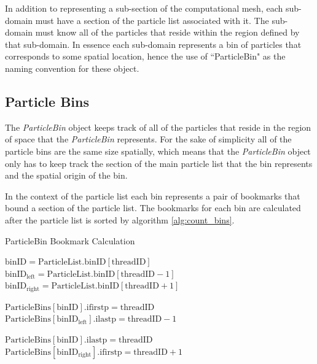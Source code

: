 In addition to representing a sub-section of the computational mesh, each sub-domain must have a section of the particle list associated with it. The sub-domain must know all of the particles that reside within the region defined by that sub-domain. In essence each sub-domain represents a bin of particles that corresponds to some spatial location, hence the use of ``ParticleBin"  as the naming convention for these object.



	\subsection{Particle Bins}
The \emph{ParticleBin} object keeps track of all of the particles that reside in the region of space that the \emph{ParticleBin} represents. For the sake of simplicity all of the particle bins are the same size spatially, which means that the \emph{ParticleBin} object only has to keep track the section of the main particle list that the bin represents and the spatial origin of the bin. 

In the context of the particle list each bin represents a pair of bookmarks that bound a section of the particle list. The bookmarks for each bin are calculated after the particle list is sorted by algorithm \ref{alg:count_bins}.

\begin{algorithm}
	\caption{ParticleBin Bookmark Calculation}
	\label{alg:count_bins}
	\begin{algorithmic}
			\STATE 
			\STATE $\mathrm{binID} = \mathrm{ParticleList.binID}[\mathrm{threadID}]$
			\STATE $\mathrm{binID_{left}} = \mathrm{ParticleList.binID}[\mathrm{threadID} - 1]$
			\STATE $\mathrm{binID_{right}} = \mathrm{ParticleList.binID}[\mathrm{threadID} + 1]$
			
				\STATE $\mathrm{ParticleBins[binID].ifirstp} = \mathrm{threadID}$
				\STATE $\mathrm{ParticleBins[binID_{left}].ilastp} = \mathrm{threadID} - 1$
			\ENDIF

				\STATE $\mathrm{ParticleBins[binID].ilastp} = \mathrm{threadID}$
				\STATE $\mathrm{ParticleBins[binID_{right}].ifirstp} = \mathrm{threadID} + 1$	
			\ENDIF
			
		\ENDFOR
	\end{algorithmic}
\end{algorithm}


